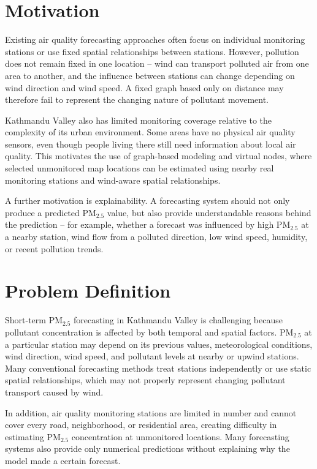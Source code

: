 \section{Motivation}


Existing air quality forecasting approaches often focus on individual monitoring
stations or use fixed spatial relationships between stations. However, pollution does
not remain fixed in one location -- wind can transport polluted air from one area to
another, and the influence between stations can change depending on wind direction and
wind speed. A fixed graph based only on distance may therefore fail to represent the
changing nature of pollutant movement.

Kathmandu Valley also has limited monitoring coverage relative to the complexity of its
urban environment. Some areas have no physical air quality sensors, even though people
living there still need information about local air quality. This motivates the use of
graph-based modeling and virtual nodes, where selected unmonitored map locations can be
estimated using nearby real monitoring stations and wind-aware spatial relationships.

A further motivation is explainability. A forecasting system should not only produce a
predicted PM$_{2.5}$ value, but also provide understandable reasons behind the prediction --
for example, whether a forecast was influenced by high PM$_{2.5}$ at a nearby station, wind
flow from a polluted direction, low wind speed, humidity, or recent pollution trends.

\section{Problem Definition}


Short-term PM$_{2.5}$ forecasting in Kathmandu Valley is challenging because pollutant
concentration is affected by both temporal and spatial factors. PM$_{2.5}$ at a particular
station may depend on its previous values, meteorological conditions, wind direction,
wind speed, and pollutant levels at nearby or upwind stations. Many conventional
forecasting methods treat stations independently or use static spatial relationships,
which may not properly represent changing pollutant transport caused by wind.

In addition, air quality monitoring stations are limited in number and cannot cover
every road, neighborhood, or residential area, creating difficulty in estimating PM$_{2.5}$
concentration at unmonitored locations. Many forecasting systems also provide only
numerical predictions without explaining why the model made a certain forecast.

